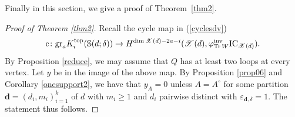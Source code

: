 \documentclass [11pt,oneside,a4paper,mathscr]{amsart}
\newtheorem{cor}[thm]{Corollary}
\theoremstyle{definition}
\newtheorem{remark}[thm]{Remark}
\renewcommand{\geq}{\geqslant}
\newcommand{\X}{\mathscr{X}}
\newcommand{\Tr}{\mathop{\rm Tr}}
\begin{document}





Finally in this section, we give a proof of Theorem~\ref{thm2}. 
\begin{proof}[Proof of Theorem \ref{thm2}]
Recall the cycle map in (\ref{cyclesdv})
\[\mathrm{c}\colon \mathrm{gr}_a K_i^{\mathrm{top}}(\mathbb{S}(d; \delta))\to H^{\dim \X(d)-2a-i}(\X(d), \varphi_{\Tr W}^{\rm{inv}}
\mathrm{IC}_{\X(d)}).\]
By Proposition \ref{reduce}, we may assume that $Q$ has at least two loops at every vertex.
    Let $y$ be in the image of the above map. 
    By Proposition \ref{prop06} and Corollary \ref{onesupport2},
    we have that $y_A=0$ unless $A=A^\circ$ for some partition $\mathbf{d}=(d_i, m_i)_{i=1}^k$ of $d$ with $m_i\geq 1$ and $d_i$ pairwise distinct with $\varepsilon_{\mathbf{d}, \delta}=1$. The statement thus follows.
\end{proof}

\end{document}
